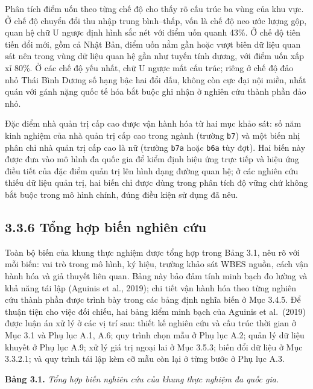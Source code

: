 \documentclass[
  a4paper,
  13pt]{extreport}
\begin{document}
Phân tích điểm uốn theo từng chế độ cho thấy rõ cấu trúc ba vùng của khu
vực. Ở chế độ chuyển đổi thu nhập trung bình--thấp, vốn là chế độ neo
ước lượng gộp, quan hệ chữ U ngược định hình sắc nét với điểm uốn quanh
43\%. Ở chế độ tiên tiến đổi mới, gồm cả Nhật Bản, điểm uốn nằm gần hoặc
vượt biên dữ liệu quan sát nên trong vùng dữ liệu quan hệ gần như tuyến
tính dương, với điểm uốn xấp xỉ 80\%. Ở các chế độ yếu nhất, chữ U ngược
mất cấu trúc; riêng ở chế độ đảo nhỏ Thái Bình Dương số hạng bậc hai đổi
dấu, không còn cực đại nội miền, nhất quán với gánh nặng quốc tế hóa bắt
buộc ghi nhận ở nghiên cứu thành phần đảo nhỏ.

Đặc điểm nhà quản trị cấp cao được vận hành hóa từ hai mục khảo sát: số
năm kinh nghiệm của nhà quản trị cấp cao trong ngành (trường
\texttt{b7}) và một biến nhị phân chỉ nhà quản trị cấp cao là nữ (trường
\texttt{b7a} hoặc \texttt{b6a} tùy đợt). Hai biến này được đưa vào mô
hình đa quốc gia để kiểm định hiệu ứng trực tiếp và hiệu ứng điều tiết
của đặc điểm quản trị lên hình dạng đường quan hệ; ở các nghiên cứu
thiếu dữ liệu quản trị, hai biến chỉ được dùng trong phân tích độ vững
chứ không bắt buộc trong mô hình chính, đúng điều kiện sử dụng đã nêu.

\hypertarget{tux1ed5ng-hux1ee3p-biux1ebfn-nghiuxean-cux1ee9u}{%
\subsection{3.3.6 Tổng hợp biến nghiên
cứu}\label{tux1ed5ng-hux1ee3p-biux1ebfn-nghiuxean-cux1ee9u}}

Toàn bộ biến của khung thực nghiệm được tổng hợp trong Bảng 3.1, nêu rõ
với mỗi biến: vai trò trong mô hình, ký hiệu, trường khảo sát WBES
nguồn, cách vận hành hóa và giả thuyết liên quan. Bảng này bảo đảm tính
minh bạch đo lường và khả năng tái lập (Aguinis et al., 2019); chi tiết
vận hành hóa theo từng nghiên cứu thành phần được trình bày trong các
bảng định nghĩa biến ở Mục 3.4.5. Để thuận tiện cho việc đối chiếu, hai
bảng kiểm minh bạch của Aguinis et al.~(2019) được luận án xử lý ở các
vị trí sau: thiết kế nghiên cứu và cấu trúc thời gian ở Mục 3.1 và Phụ
lục A.1, A.6; quy trình chọn mẫu ở Phụ lục A.2; quản lý dữ liệu khuyết ở
Phụ lục A.9; xử lý giá trị ngoại lai ở Mục 3.5.3; biến đổi dữ liệu ở Mục
3.3.2.1; và quy trình tái lập kèm cỡ mẫu còn lại ở từng bước ở Phụ lục
A.3.

\textbf{Bảng 3.1.} \emph{Tổng hợp biến nghiên cứu của khung thực nghiệm
đa quốc gia.}
\end{document}
